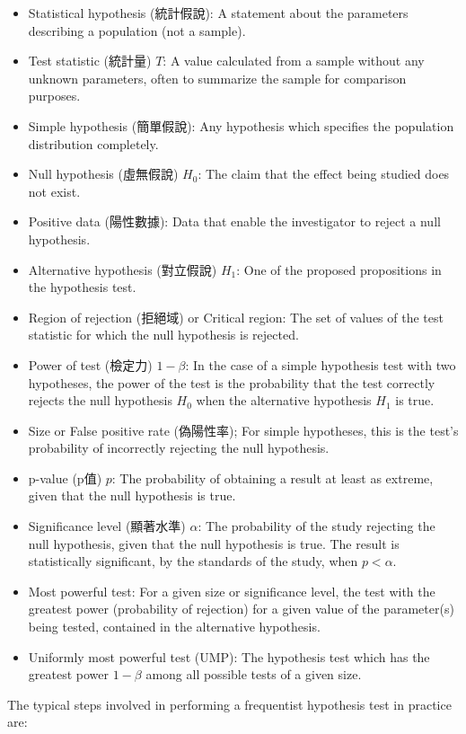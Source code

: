 \documentclass[a4paper,12pt]{report}
\begin{document}
\begin{itemize}
\item Statistical hypothesis (統計假說): A statement about the parameters describing a population (not a sample).
\item Test statistic (統計量) $T$: A value calculated from a sample without any unknown parameters, often to summarize the sample for comparison purposes.
\item Simple hypothesis (簡單假說): Any hypothesis which specifies the population distribution completely.
\item Null hypothesis (虛無假說) $H_0$: The claim that the effect being studied does not exist.
\item Positive data (陽性數據): Data that enable the investigator to reject a null hypothesis.
\item Alternative hypothesis (對立假說) $H_1$: One of the proposed propositions in the hypothesis test.
\item Region of rejection (拒絕域) or Critical region: The set of values of the test statistic for which the null hypothesis is rejected.
\item Power of test (檢定力) $1-\beta$: In the case of a simple hypothesis test with two hypotheses, the power of the test is the probability that the test correctly rejects the null hypothesis $H_0$ when the alternative hypothesis $H_1$ is true.
\item Size or False positive rate (偽陽性率); For simple hypotheses, this is the test's probability of incorrectly rejecting the null hypothesis.
\item p-value (p值) $p$: The probability of obtaining a result at least as extreme, given that the null hypothesis is true.
\item Significance level (顯著水準) $\alpha$: The probability of the study rejecting the null hypothesis, given that the null hypothesis is true. The result is statistically significant, by the standards of the study, when $p<\alpha$.
\item Most powerful test: For a given size or significance level, the test with the greatest power (probability of rejection) for a given value of the parameter(s) being tested, contained in the alternative hypothesis.
\item Uniformly most powerful test (UMP): The hypothesis test which has the greatest power $1-\beta$ among all possible tests of a given size. 
\end{itemize}
The typical steps involved in performing a frequentist hypothesis test in practice are:
\end{document}
